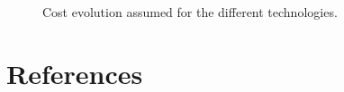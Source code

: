 \documentclass[3p]{elsarticle} %
\begin{document}
\begin{figure}[!h]
\centering
\caption{Cost evolution assumed for the different technologies. } \label{fig_cost_evolution} 
\end{figure}


 
\section{References}

\end{document}
